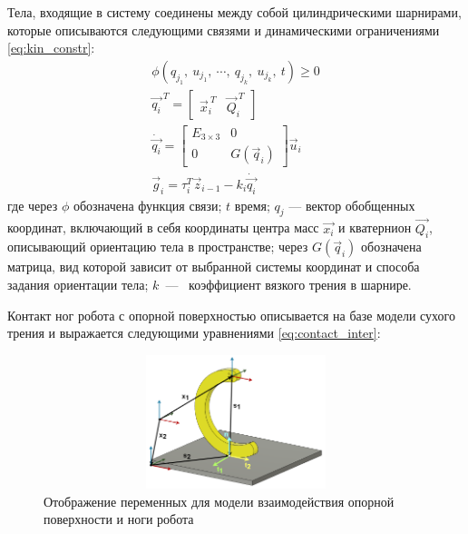 Тела, входящие в систему соединены между собой цилиндрическими шарнирами, которые описываются следующими связями и динамическими ограничениями \eqref{eq:kin_constr}:
\begin{align}
    \label{eq:kin_constr}
    \phi(q_{j_1},\ u_{j_1},\ \cdots,\ q_{j_k},\ u_{j_k},\ t) \geqslant  0 \\
    \vec{q_i}^{\ T} = \begin{bmatrix}
        \vec{x}_i^{\ T} & \vec{Q}_i^{\ T}
    \end{bmatrix} \\
    \dot{\vec{q_i}} = \begin{bmatrix}
    E_{3\times3} & 0\\ 
    0 & G(\vec{q}_i) 
    \end{bmatrix}\vec{u}_i  \\
    \vec{g}_i = \tau_i^T \vec{z}_{i-1} -k_i \dot{\vec{q_i}}
\end{align}
где через $\phi$ обозначена функция связи; $t$ время; $q_{j}$ --- вектор обобщенных координат, включающий в себя координаты центра масс $\vec{x_i}$ и кватернион $\vec{Q_i}$, описывающий ориентацию тела в пространстве; через $G(\vec{q}_i)$ обозначена матрица, вид которой зависит от выбранной системы координат и способа задания ориентации тела; $k$~---~ коэффициент вязкого трения в шарнире.

Контакт ног робота с опорной поверхностью  описывается на базе модели сухого трения и выражается следующими уравнениями \eqref{eq:contact_inter}:

\begin{figure}[H]
    \centering\includegraphics[height=3.9cm,width=1\textwidth,keepaspectratio]{images/contact_interaction.png}
    \caption{Отображение переменных для модели взаимодействия опорной поверхности и ноги робота}
    \label{fig:contact_interaction.png}
\end{figure}

